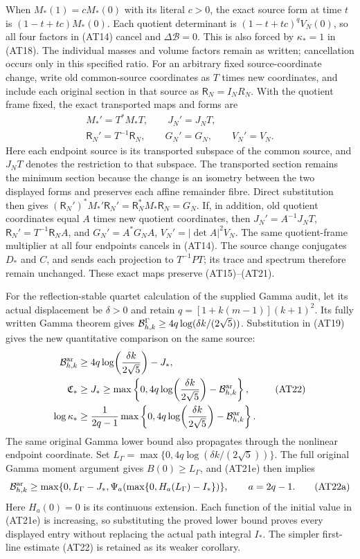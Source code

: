 When $M_*(1)=cM_*(0)$ with its literal $c>0$, the exact source
form at time $t$ is $(1-t+tc)M_*(0)$. Each quotient determinant
is $(1-t+tc)^qV_N(0)$, so all four factors in (AT14) cancel
and $\Delta\mathcal B=0$. This is also forced by
$\kappa_*=1$ in (AT18). The individual masses and volume
factors remain as written; cancellation occurs only in this
specified ratio. For an arbitrary fixed source-coordinate change, write old
common-source coordinates as $T$ times new coordinates, and include
each original section in that source as $\mathsf R_N=I_NR_N$.
With the quotient frame fixed, the exact transported maps and forms are
\[
 \begin{gathered}
 M_*'=T^*M_*T,\qquad J_N'=J_NT,\\
 \mathsf R_N'=T^{-1}\mathsf R_N,
 \qquad G_N'=G_N,\qquad V_N'=V_N.
 \end{gathered}
\]
Here each endpoint source is its transported subspace of the
common source, and $J_NT$ denotes the restriction to that subspace.
The transported section remains the minimum section because the
change is an isometry between the two displayed forms and preserves
each affine remainder fibre. Direct substitution then gives
$(\mathsf R_N')^*M_*'\mathsf R_N'=\mathsf R_N^*M_*\mathsf R_N=G_N$.
If, in addition,
old quotient coordinates equal $A$ times new quotient coordinates,
then $J_N'=A^{-1}J_NT$, $\mathsf R_N'=T^{-1}\mathsf R_NA$, and
$G_N'=A^*G_NA$, $V_N'=|\det A|^2V_N$.
The same quotient-frame multiplier at all four endpoints cancels
in (AT14). The source change conjugates $D_*$ and $C$, and sends
each projection to $T^{-1}PT$; its trace and spectrum therefore
remain unchanged. These exact maps preserve (AT15)--(AT21).

For the reflection-stable quartet calculation of the supplied
Gamma audit, let its actual displacement be $\delta>0$ and
retain $q=[1+k(m-1)](k+1)^2$. Its fully written Gamma theorem
gives $\mathcal B^\Gamma_{h,k}\ge
4q\log(\delta k/(2\sqrt5))$. Substitution in (AT19) gives the
new quantitative comparison on the same source:
\[
\begin{aligned}
 \mathcal B^{\mathrm{ar}}_{h,k}&\ge
 4q\log\!\left(\frac{\delta k}{2\sqrt5}\right)-J_*,\\
 \mathfrak C_*&\ge J_*\ge\max\left\{0,
 4q\log\!\left(\frac{\delta k}{2\sqrt5}\right)-\mathcal B^{\mathrm{ar}}_{h,k}\right\},\\
 \log\kappa_*&\ge\frac{1}{2q-1}\max\left\{0,
 4q\log\!\left(\frac{\delta k}{2\sqrt5}\right)-\mathcal B^{\mathrm{ar}}_{h,k}\right\}.
\end{aligned}\tag{AT22}
\]
The same original Gamma lower bound also propagates through the
nonlinear endpoint coordinate. Set
$L_\Gamma=\max\{0,4q\log(\delta k/(2\sqrt5))\}$.
The full original Gamma moment argument gives $B(0)\ge L_\Gamma$,
and (AT21e) then implies
\[
\mathcal B^{\mathrm{ar}}_{h,k}\ge
\max\{0,L_\Gamma-J_*,
 \Psi_a(\max\{0,H_a(L_\Gamma)-I_*\})\},\qquad a=2q-1.
\tag{AT22a}
\]
Here $H_a(0)=0$ is its continuous extension. Each function of the
initial value in (AT21e) is increasing, so substituting the proved
lower bound proves every displayed entry without replacing the
actual path integral $I_*$. The simpler first-line estimate (AT22)
is retained as its weaker corollary.

